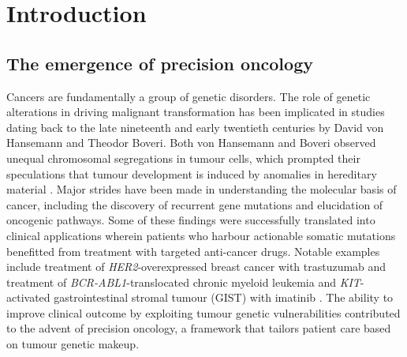 
\chapter{Introduction}
\label{ch:Introduction}

\section{The emergence of precision oncology}
\label{sec:Theemergenceofprecisiononcology}

Cancers are fundamentally a group of genetic disorders. The role of genetic alterations in driving malignant transformation has been implicated in studies dating back to the late nineteenth and early twentieth centuries by David von Hansemann and Theodor Boveri. Both von Hansemann and Boveri observed unequal chromosomal segregations in tumour cells, which prompted their speculations that tumour development is induced by anomalies in hereditary material \cite{VonHansemann1890, Boveri1914}. Major strides have been made in understanding the molecular basis of cancer, including the discovery of recurrent gene mutations and elucidation of oncogenic pathways. Some of these findings were successfully translated into clinical applications wherein patients who harbour actionable somatic mutations benefitted from treatment with targeted anti-cancer drugs. Notable examples include treatment of \textit{\acs{HER2}}-overexpressed breast cancer with trastuzumab \cite{Slamon1987, Andrulis1998, Sjogren1998, Drebin1985, Vogel2002, Seidman2008} and treatment of \textit{BCR-ABL1}-translocated chronic myeloid leukemia and \textit{KIT}-activated gastrointestinal stromal tumour (GIST) with imatinib \cite{Rowley1973, Druker2006}. The ability to improve clinical outcome by exploiting tumour genetic vulnerabilities contributed to the advent of precision oncology, a framework that tailors patient care based on tumour genetic makeup.

